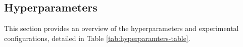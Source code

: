 \documentclass[letterpaper]{article} %
\begin{document}


\subsection{Hyperparameters}
\label{ap:hyperparameters}
This section provides an overview of the hyperparameters and experimental configurations, detailed in Table \ref{tab:hyperparamters-table}.
\end{document}
